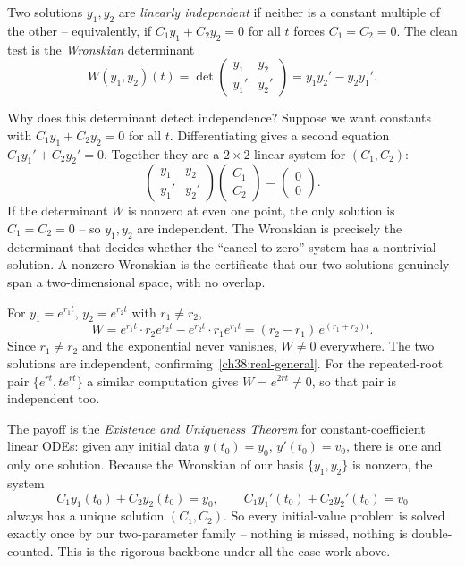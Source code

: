 Two solutions $y_1, y_2$ are \emph{linearly independent} if neither is a constant
multiple of the other -- equivalently, if $C_1 y_1 + C_2 y_2 = 0$ for all $t$
forces $C_1 = C_2 = 0$. The clean test is the \emph{Wronskian} determinant
\[
  W(y_1, y_2)(t) = \det\begin{pmatrix} y_1 & y_2 \\ y_1' & y_2' \end{pmatrix}
  = y_1 y_2' - y_2 y_1'.
\]

\begin{whybox}
Why does this determinant detect independence? Suppose we want constants with
$C_1 y_1 + C_2 y_2 = 0$ for all $t$. Differentiating gives a second equation
$C_1 y_1' + C_2 y_2' = 0$. Together they are a $2\times 2$ linear system for
$(C_1, C_2)$:
\[
  \begin{pmatrix} y_1 & y_2 \\ y_1' & y_2' \end{pmatrix}
  \begin{pmatrix} C_1 \\ C_2 \end{pmatrix} = \begin{pmatrix} 0 \\ 0 \end{pmatrix}.
\]
If the determinant $W$ is nonzero at even one point, the only solution is $C_1 =
C_2 = 0$ -- so $y_1, y_2$ are independent. The Wronskian is precisely the
determinant that decides whether the ``cancel to zero'' system has a nontrivial
solution. A nonzero Wronskian is the certificate that our two solutions genuinely
span a two-dimensional space, with no overlap.
\end{whybox}

\begin{example}
\label{ch38:ex-wronskian}
For $y_1 = e^{r_1 t}$, $y_2 = e^{r_2 t}$ with $r_1 \neq r_2$,
\[
  W = e^{r_1 t}\cdot r_2 e^{r_2 t} - e^{r_2 t}\cdot r_1 e^{r_1 t}
    = (r_2 - r_1)\,e^{(r_1 + r_2)t}.
\]
Since $r_1 \neq r_2$ and the exponential never vanishes, $W \neq 0$ everywhere.
The two solutions are independent, confirming~\eqref{ch38:real-general}. For the
repeated-root pair $\{e^{rt}, t e^{rt}\}$ a similar computation gives $W = e^{2rt}
\neq 0$, so that pair is independent too.
\end{example}

\begin{formalbox}
The payoff is the \emph{Existence and Uniqueness Theorem} for constant-coefficient
linear ODEs: given any initial data $y(t_0) = y_0$, $y'(t_0) = v_0$, there is one
and only one solution. Because the Wronskian of our basis $\{y_1, y_2\}$ is
nonzero, the system
\[
  C_1 y_1(t_0) + C_2 y_2(t_0) = y_0, \qquad
  C_1 y_1'(t_0) + C_2 y_2'(t_0) = v_0
\]
always has a unique solution $(C_1, C_2)$. So every initial-value problem is
solved exactly once by our two-parameter family -- nothing is missed, nothing is
double-counted. This is the rigorous backbone under all the case work above.
\end{formalbox}

